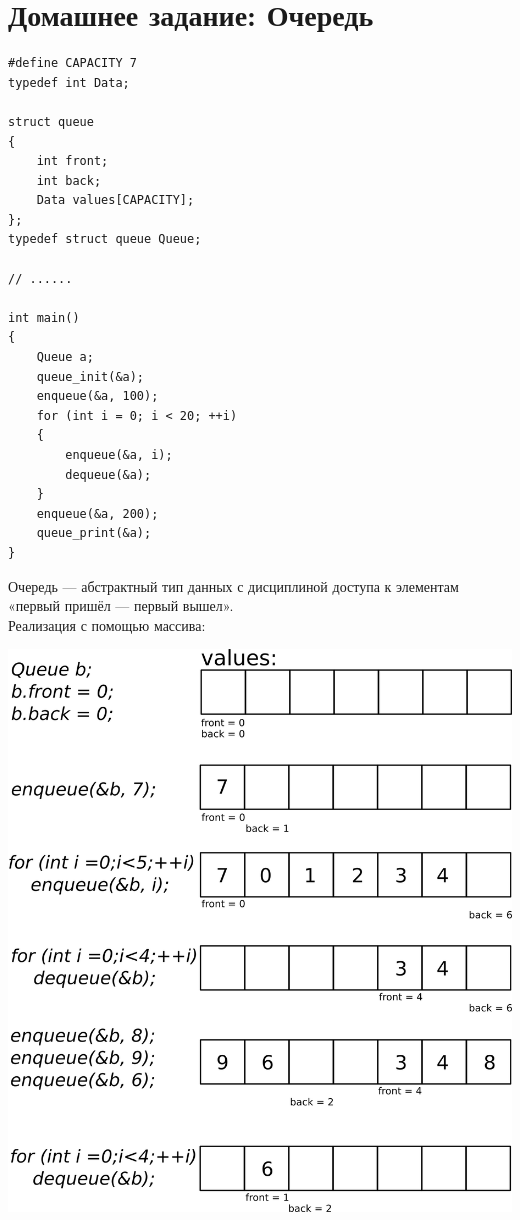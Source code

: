 \documentclass{article}
\begin{document}
\section*{Домашнее задание: Очередь}
\begin{multicols}{2}
\begin{lstlisting}
#define CAPACITY 7
typedef int Data;

struct queue
{
    int front;
    int back;
    Data values[CAPACITY];
};
typedef struct queue Queue;

// ......

int main()
{
    Queue a;
    queue_init(&a);
    enqueue(&a, 100);
    for (int i = 0; i < 20; ++i)
    {
        enqueue(&a, i);
        dequeue(&a);
    }
    enqueue(&a, 200);
    queue_print(&a);
}
\end{lstlisting}
\vfill\null
Очередь — абстрактный тип данных с дисциплиной доступа к элементам «первый пришёл — первый вышел». \\
Реализация с помощью массива:
\begin{center}
\includegraphics[width=1.05\linewidth]{../../images/queue.png}
\end{center}
\end{multicols}
\end{document}
